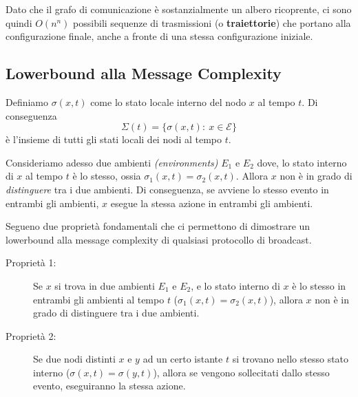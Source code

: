 Dato che il grafo di comunicazione è sostanzialmente un albero ricoprente, ci sono quindi $O(n^n)$ possibili sequenze di trasmissioni (o \textbf{traiettorie}) che portano alla configurazione finale, anche a fronte di una stessa configurazione iniziale.

\subsection{Lowerbound alla Message Complexity}

\begin{definizione}
    Definiamo $\sigma(x, t)$ come lo stato locale interno del nodo $x$ al tempo $t$. Di conseguenza $$\Sigma(t) = \{\sigma(x, t) :\ x \in \mathcal{E} \}$$ è l'insieme di tutti gli stati locali dei nodi al tempo $t$.
\end{definizione}
Consideriamo adesso due ambienti \textit{(environments)} $E_1$ e $E_2$ dove, lo stato interno di $x$ al tempo $t$ è lo stesso, ossia $\sigma_1(x, t) = \sigma_2(x, t)$. Allora $x$ non è in grado di \textit{distinguere} tra i due ambienti. Di conseguenza, se avviene lo stesso evento in entrambi gli ambienti, $x$ esegue la stessa azione in entrambi gli ambienti.

Segueno due proprietà fondamentali che ci permettono di dimostrare un lowerbound alla message complexity di qualsiasi protocollo di broadcast.
\begin{description}
    \item[Proprietà 1:] Se $x$ si trova in due ambienti $E_1$ e $E_2$, e lo stato interno di $x$ è lo stesso in entrambi gli ambienti al tempo $t$ ($\sigma_1(x, t) = \sigma_2(x, t)$), allora $x$ non è in grado di distinguere tra i due ambienti.
    \item[Proprietà 2:] Se due nodi distinti $x$ e $y$ ad un certo istante $t$ si trovano nello stesso stato interno ($\sigma(x, t) = \sigma(y, t)$), allora se vengono sollecitati dallo stesso evento, eseguiranno la stessa azione.
\end{description}


